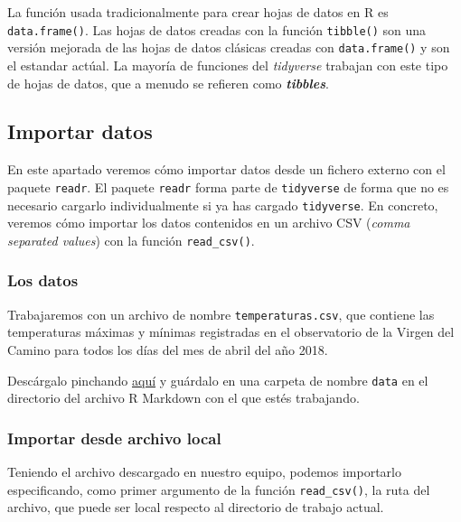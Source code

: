 \documentclass[
  title=normal,
  notoc,
  bib=normal]{mnye}
\begin{document}
\begin{infobox}
La función usada tradicionalmente para crear hojas de datos en \textsf{R} es \texttt{data.frame()}. Las hojas de datos creadas con la función \texttt{tibble()} son una versión mejorada de las hojas de datos clásicas creadas con \texttt{data.frame()} y son el estandar actúal. La mayoría de funciones del \textit{tidyverse} trabajan con este tipo de hojas de datos, que a menudo se refieren como \textit{\textbf{tibbles}}.

\end{infobox}

\hypertarget{import}{%
\subsection{Importar datos}\label{import}}

En este apartado veremos cómo importar datos desde un fichero externo con el paquete \texttt{readr}. El paquete \texttt{readr} forma parte de \texttt{tidyverse} de forma que no es necesario cargarlo individualmente si ya has cargado \texttt{tidyverse}. En concreto, veremos cómo importar los datos contenidos en un archivo CSV (\emph{comma separated values}) con la función \texttt{read\_csv()}.

\hypertarget{los-datos}{%
\subsubsection{Los datos}\label{los-datos}}

Trabajaremos con un archivo de nombre \texttt{temperaturas.csv}, que contiene las temperaturas máximas y mínimas registradas en el observatorio de la Virgen del Camino para todos los días del mes de abril del año 2018.

Descárgalo pinchando \href{https://drive.google.com/uc?export=download\&id=1xDIvAcQSS4_dFoSIO2hcprhqnbXJqx9r}{aquí} y guárdalo en una carpeta de nombre \texttt{data} en el directorio del archivo R Markdown con el que estés trabajando.

\hypertarget{importar-desde-archivo-local}{%
\subsubsection{Importar desde archivo local}\label{importar-desde-archivo-local}}

Teniendo el archivo descargado en nuestro equipo, podemos importarlo especificando, como primer argumento de la función \texttt{read\_csv()}, la ruta del archivo, que puede ser local respecto al directorio de trabajo actual.
\end{document}
